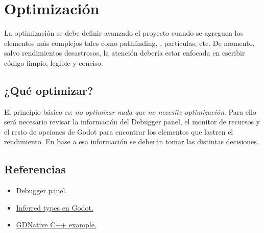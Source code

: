 
\section{Optimización}\label{optimizacion:optimizacion}

La optimización se debe definir avanzado el proyecto cuando se agreguen los elementos más complejos tales como pathfinding, , partículas, etc. De momento, salvo rendimientos desastrosos, la atención debería estar enfocada en escribir código limpio, legible y conciso.

\subsection{¿Qué optimizar?}
El principio básico es: \emph{no optimizar nada que no necesite optimización}. Para ello será necesario revisar la información del Debugger panel, el monitor de recursos y el resto de opciones de Godot para encontrar los elementos que lastren el rendimiento. En base a esa información se deberán tomar las distintas decisiones.

\subsection{Referencias}
\begin{itemize}
\item \href{https://docs.godotengine.org/en/stable/tutorials/debug/debugger_panel.html}{Debugger panel.}
\item \href{https://docs.godotengine.org/en/stable/getting_started/scripting/gdscript/gdscript_styleguide.html#inferred-types}{Inferred types en Godot.}
\item \href{https://docs.godotengine.org/en/stable/tutorials/plugins/gdnative/gdnative-cpp-example.html}{GDNative C++ example.}
\end{itemize}
